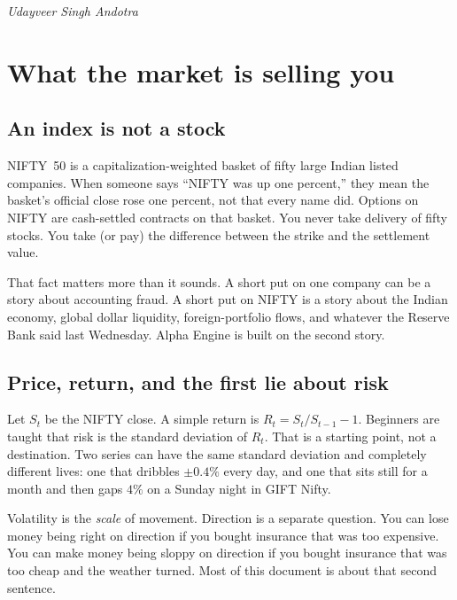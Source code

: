 \documentclass[11pt,a4paper]{article}
\begin{document}
\vspace{0.8em}
\noindent\textit{Udayveer Singh Andotra}

\newpage

\section{What the market is selling you}
\label{ch:market}

\subsection{An index is not a stock}

NIFTY~50 is a capitalization-weighted basket of fifty large Indian listed companies. When someone says ``NIFTY was up one percent,'' they mean the basket's official close rose one percent, not that every name did. Options on NIFTY are cash-settled contracts on that basket. You never take delivery of fifty stocks. You take (or pay) the difference between the strike and the settlement value.

That fact matters more than it sounds. A short put on one company can be a story about accounting fraud. A short put on NIFTY is a story about the Indian economy, global dollar liquidity, foreign-portfolio flows, and whatever the Reserve Bank said last Wednesday. Alpha Engine is built on the second story.

\subsection{Price, return, and the first lie about risk}

Let $S_t$ be the NIFTY close. A simple return is $R_t = S_t/S_{t-1}-1$. Beginners are taught that risk is the standard deviation of $R_t$. That is a starting point, not a destination. Two series can have the same standard deviation and completely different lives: one that dribbles $\pm 0.4\%$ every day, and one that sits still for a month and then gaps $4\%$ on a Sunday night in GIFT Nifty.

Volatility is the \emph{scale} of movement. Direction is a separate question. You can lose money being right on direction if you bought insurance that was too expensive. You can make money being sloppy on direction if you bought insurance that was too cheap and the weather turned. Most of this document is about that second sentence.
\end{document}
